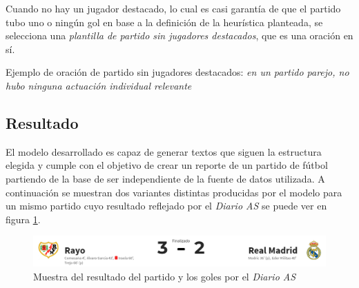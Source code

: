     Cuando no hay un jugador destacado, lo cual es casi garantía de que el partido tubo uno o ningún gol en base a la definición de la heurística planteada, se selecciona una 
    \textit{plantilla de partido sin jugadores destacados}, que es una oración en sí.

    Ejemplo de oración de partido sin jugadores destacados: \textit{en un partido parejo, no hubo ninguna actuación individual relevante}


\subsection{Resultado}

    El modelo desarrollado es capaz de generar textos que siguen la estructura elegida y cumple con el objetivo de 
crear un reporte de un partido de fútbol partiendo de la base de ser independiente de la fuente de datos utilizada. 
A continuación se muestran  dos variantes distintas producidas por el modelo para un mismo partido cuyo resultado reflejado por el 
\textit{Diario AS} se puede ver en figura \ref{fig_rayomadrid}.
\\

\begin{figure}[!]
    \begin{center}
        \includegraphics[scale=0.4]{Graphics/rayomadrid.png}
    \end{center}
    \caption{Muestra del resultado del partido y los goles por el \textit{Diario AS}}
    \label{fig_rayomadrid}
\end{figure}

